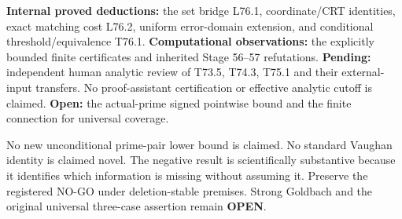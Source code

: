 \documentclass[11pt,a4paper]{article}
\begin{document}
\textbf{Internal proved deductions:} the set bridge L76.1, coordinate/CRT identities, exact matching cost L76.2, uniform error-domain extension, and conditional threshold/equivalence T76.1. \textbf{Computational observations:} the explicitly bounded finite certificates and inherited Stage 56--57 refutations. \textbf{Pending:} independent human analytic review of T73.5, T74.3, T75.1 and their external-input transfers. No proof-assistant certification or effective analytic cutoff is claimed. \textbf{Open:} the actual-prime signed pointwise bound and the finite connection for universal coverage.

No new unconditional prime-pair lower bound is claimed. No standard Vaughan identity is claimed novel. The negative result is scientifically substantive because it identifies which information is missing without assuming it. Preserve the registered NO-GO under deletion-stable premises. Strong Goldbach and the original universal three-case assertion remain \textbf{OPEN}.
\end{document}

